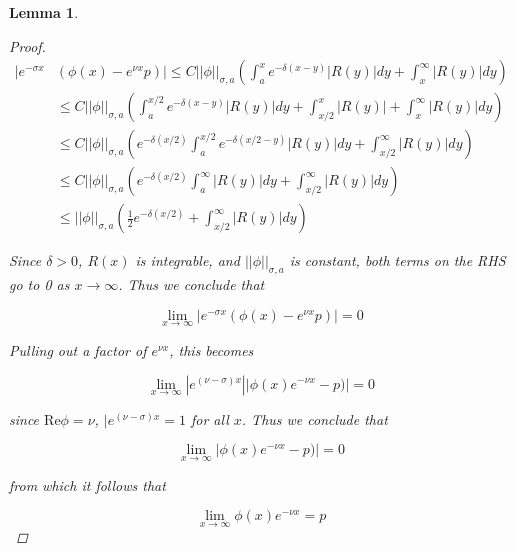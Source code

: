 \documentclass[12pt]{article}
\newtheorem{lemma}{Lemma}
\begin{document}
\begin{lemma}
\begin{proof}
\begin{align*}
|e^{-\sigma x} &(\phi(x) - e^{\nu x} p)| \leq C ||\phi||_{\sigma, a}\left( \int_a^x e^{-\delta(x - y)}|R(y)| dy + \int_x^\infty |R(y)|dy \right) \\
&\leq C ||\phi||_{\sigma, a}\left( \int_a^{x/2} e^{-\delta(x - y)}|R(y)| dy + \int_{x/2}^x |R(y)|+ \int_x^\infty |R(y)|dy \right)\\
&\leq C ||\phi||_{\sigma, a}\left( e^{-\delta(x/2)} \int_a^{x/2} e^{-\delta(x/2 - y)}|R(y)| dy + \int_{x/2}^\infty |R(y)|dy \right)\\
&\leq C ||\phi||_{\sigma, a}\left( e^{-\delta(x/2)} \int_a^{\infty} |R(y)| dy + \int_{x/2}^\infty |R(y)|dy \right)\\
&\leq ||\phi||_{\sigma, a}\left(\frac{1}{2} e^{-\delta(x/2)} + \int_{x/2}^\infty |R(y)|dy \right)
\end{align*}

Since $\delta > 0$, $R(x)$ is integrable, and $||\phi||_{\sigma, a}$ is constant, both terms on the RHS go to 0 as $x \rightarrow \infty$. Thus we conclude that

\[
\lim_{x \rightarrow \infty} |e^{-\sigma x} (\phi(x) - e^{\nu x} p)| = 0
\]

Pulling out a factor of $e^{\nu x}$, this becomes 

\[
\lim_{x \rightarrow \infty} |e^{(\nu - \sigma) x}||\phi(x) e^{-\nu x} - p)| = 0
\]

since $\text{Re} \phi = \nu$, $|e^{(\nu - \sigma) x} = 1$ for all $x$. Thus we conclude that

\[
\lim_{x \rightarrow \infty} |\phi(x) e^{-\nu x} - p)| = 0
\]  

from which it follows that

\[
\lim_{x\rightarrow\infty} \phi(x) e^{-\nu x} = p
\]

\end{proof}
\end{lemma}
\end{document}
